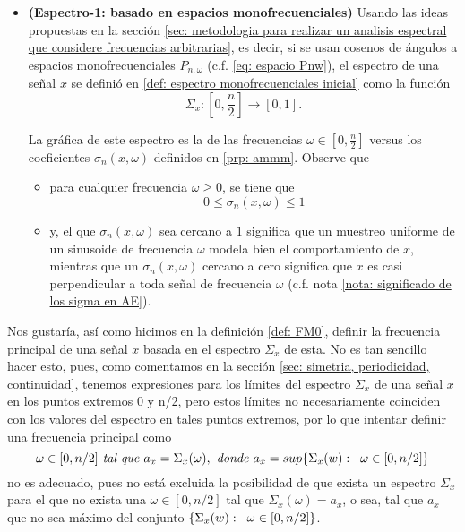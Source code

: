 \begin{itemize}
	\item \textbf{(Espectro-1: basado en espacios monofrecuenciales)} 
	Usando
	las ideas propuestas en 
	la sección
	\ref{sec: metodologia para realizar un analisis espectral que considere frecuencias arbitrarias}, 
	es decir, si se usan cosenos de ángulos a
	espacios monofrecuenciales $P_{n, \omega}$
	(c.f. \ref{eq: espacio Pnw}), el espectro
	de una señal $x$ se definió en
	\ref{def: espectro monofrecuenciales inicial}
	como la función 
	\[
	\Sigma_{x} : \left[0, \frac{n}{2} \right] \longrightarrow [0,1].
	\]
	
	La gráfica de este espectro es la de 
	las frecuencias $\omega \in [0, \frac{n}{2}]$ versus	
	los coeficientes
	$\sigma_{n}(x, \omega)$ definidos en 
	\ref{prp: ammm}. Observe que
	\begin{itemize}
		\item para cualquier frecuencia $\omega \geq 0$, se tiene que
		\[
		0 \leq \sigma_{n}(x, \omega) \leq 1
		\]
		\item 
	y, el que
	$\sigma_{n}(x, \omega)$ sea cercano a $1$ significa que un
	muestreo uniforme de un sinusoide de frecuencia $\omega$
	modela bien el comportamiento de $x$,
	mientras que un $\sigma_{n}(x, \omega)$ cercano
	a cero significa que 
	$x$ es casi perpendicular a toda señal de frecuencia $\omega$
	(c.f. nota \ref{nota: significado de los sigma en AE}).
	\end{itemize}
\end{itemize}

Nos gustaría, así como hicimos en la definición
\ref{def: FM0}, definir la frecuencia principal 
de una señal $x$ basada en el espectro
$\Sigma_{x}$ de esta. No es tan sencillo hacer esto, pues,
como comentamos en la sección
\ref{sec: simetria, periodicidad, continuidad}, 
tenemos expresiones para los límites del 
espectro $\Sigma_{x}$ de una señal $x$
en los puntos extremos $0$ y n/2,
pero estos límites no necesariamente coinciden con los
valores del espectro en tales puntos extremos,
por lo que intentar definir una
frecuencia principal como
\[
\omega \in [0, n/2] \textit{ tal que }
a_{x} = \Sigma_{x}(\omega), \textit{ donde }
a_{x} = sup \{ \Sigma_{x}(w): \hspace{0.2cm} \omega
\in [0, n/2] \}
\]
no es adecuado, pues no está excluida la 
posibilidad de que exista un espectro $\Sigma_{x}$
para el que no exista una $\omega \in [0, n/2]$ 
tal que $\Sigma_{x}(\omega) = a_{x}$, o sea, tal que 
$a_{x}$ que no sea máximo
del conjunto 
$\{ \Sigma_{x}(w): \hspace{0.2cm} \omega
\in [0, n/2] \}$. \\

